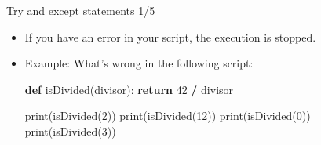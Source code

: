 \documentclass[
  8pt,
  ignorenonframetext,
]{beamer}
\newenvironment{Shaded}{\begin{snugshade}}{\end{snugshade}}
\newcommand{\BuiltInTok}[1]{#1}
\newcommand{\ControlFlowTok}[1]{\textcolor[rgb]{0.13,0.29,0.53}{\textbf{#1}}}
\newcommand{\DecValTok}[1]{\textcolor[rgb]{0.00,0.00,0.81}{#1}}
\newcommand{\KeywordTok}[1]{\textcolor[rgb]{0.13,0.29,0.53}{\textbf{#1}}}
\newcommand{\NormalTok}[1]{#1}
\newcommand{\OperatorTok}[1]{\textcolor[rgb]{0.81,0.36,0.00}{\textbf{#1}}}
\providecommand{\tightlist}{%
  \setlength{\itemsep}{0pt}\setlength{\parskip}{0pt}}
\begin{document}
\begin{frame}[fragile]{Try and except statements 1/5}
\protect\hypertarget{try-and-except-statements-15}{}
\begin{itemize}[<+->]
\tightlist
\item
  If you have an error in your script, the execution is stopped.
\end{itemize}

\begin{itemize}[<+->]
\item
  Example: What's wrong in the following script:

\begin{Shaded}
\begin{Highlighting}[]
\KeywordTok{def}\NormalTok{ isDivided(divisor):}
    \ControlFlowTok{return} \DecValTok{42} \OperatorTok{/}\NormalTok{ divisor}

\BuiltInTok{print}\NormalTok{(isDivided(}\DecValTok{2}\NormalTok{))}
\BuiltInTok{print}\NormalTok{(isDivided(}\DecValTok{12}\NormalTok{))}
\BuiltInTok{print}\NormalTok{(isDivided(}\DecValTok{0}\NormalTok{))}
\BuiltInTok{print}\NormalTok{(isDivided(}\DecValTok{3}\NormalTok{))}
\end{Highlighting}
\end{Shaded}
\end{itemize}
\end{frame}
\end{document}
